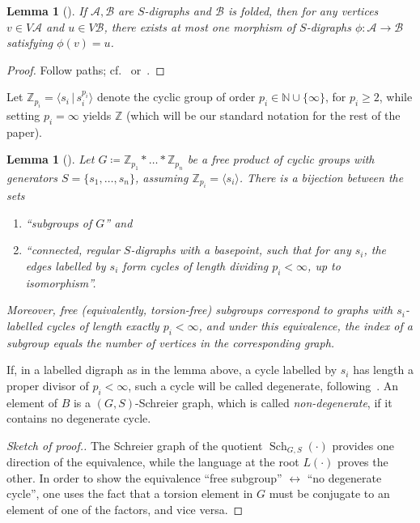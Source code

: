 \documentclass[10pt,a4paper]{amsart}
\newcommand{\cf}{cf.\ }
\newtheorem{lemm}[theo]{Lemma}
\theoremstyle{definition}
\newcommand{\ZZ}{\mathbb{Z}}
\newcommand{\cA}{\mathcal{A}}
\newcommand{\cB}{\mathcal{B}}
\DeclareMathOperator{\Sch}{Sch}
\begin{document}
\begin{lemm}[{\cite[Lemma~4.2]{KM}}]
If $\cA,\cB$ are $S$-digraphs and $\cB$ is folded, then for any vertices $v\in V\cA$ and $u\in V\cB$, there exists at most one morphism of $S$-digraphs ${\phi}:\cA\to \cB$ satisfying ${\phi}(v)=u$. 
\end{lemm}
\begin{proof}
Follow paths; %
\cf \cite[Lemma~4.2]{KM} or~\cite[5.1~(c)]{St}.
\end{proof}

Let $\ZZ_{p_i} = \langle s_i\, |\, s_i^{p_i} \rangle$ denote the cyclic group of order $p_i \in \mathbb{N} \cup \{\infty\}$, for $p_i\geq 2$, while setting $p_i = \infty$ yields $\ZZ$ (which will be our standard notation for the rest of the paper).

\begin{lemm}[{\cite[Theorem~1.2]{Sto}}]\label{lemma:bijection-subgroup-graph}
Let $G \coloneqq \ZZ_{p_1}* \dots *\ZZ_{p_n}$ be a free product of cyclic groups with generators $S = \{s_1, \dots, s_n\}$, assuming $\ZZ_{p_i} = \langle s_i \rangle$.
 There is a bijection between the sets
 \begin{enumerate}
 \item[$A\coloneqq $] ``subgroups of $G$'' and
 \item[$B\coloneqq $] ``connected, regular $S$-digraphs with a basepoint, such that for any $s_i$, the edges labelled by $s_i$ form cycles of length dividing $p_i < \infty$, up to isomorphism''.
 \end{enumerate}
 Moreover, free (equivalently, torsion-free) subgroups correspond to graphs with $s_i$-labelled cycles of length exactly $p_i < \infty$, and under this equivalence, the index of a subgroup equals the number of vertices in the corresponding graph.
\end{lemm}
If, in a labelled digraph as in the lemma above, a cycle labelled by $s_i$ has length a proper divisor of $p_i < \infty$, such a cycle will be called degenerate, following~\cite{Sto}. An element of $B$ is a $(G,S)$-Schreier graph, which is called \emph{non-degenerate}, if it contains no degenerate cycle.

\begin{proof}[Sketch of proof.]
The Schreier graph of the quotient $\Sch_{G,S}({\cdot})$ provides one direction of the equivalence, while the language at the root $L({\cdot})$ proves the other. In order to show the equivalence ``free subgroup'' $\leftrightarrow $ ``no degenerate cycle'', one uses the fact that a torsion element in $G$ must be conjugate to an element of one of the factors, and vice versa.
\end{proof}
\end{document}
